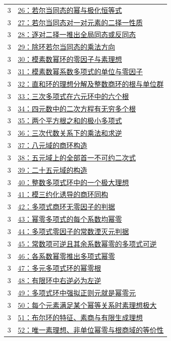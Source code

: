 \documentclass[UTF8,a4paper,11pt,fontset=windows]{ctexart}
\begin{document}
\begin{longtable}{cp{13.5cm}}
3 & \hyperref[ex:3:26]{26：若尔当同态的幂与极化恒等式}\\
3 & \hyperref[ex:3:27]{27：若尔当同态对一对元素的二择一性质}\\
3 & \hyperref[ex:3:28]{28：逐对二择一推出全局同态或反同态}\\
3 & \hyperref[ex:3:29]{29：除环若尔当同态的乘法方向}\\
3 & \hyperref[ex:3:30]{30：模素数幂环的零因子与素理想}\\
3 & \hyperref[ex:3:31]{31：模素数幂系数多项式的单位与零因子}\\
3 & \hyperref[ex:3:32]{32：直和环的理想分解及整数商环的根与单位群}\\
3 & \hyperref[ex:3:33]{33：三次多项式在六元环中的六个根}\\
3 & \hyperref[ex:3:34]{34：四元数中的二次方程有无穷多个根}\\
3 & \hyperref[ex:3:35]{35：两个平方根之和的极小多项式}\\
3 & \hyperref[ex:3:36]{36：三次代数关系下的乘法和求逆}\\
3 & \hyperref[ex:3:37]{37：八元域的商环构造}\\
3 & \hyperref[ex:3:38]{38：五元域上的全部首一不可约二次式}\\
3 & \hyperref[ex:3:39]{39：二十五元域的构造}\\
3 & \hyperref[ex:3:40]{40：整数多项式环中的一个极大理想}\\
3 & \hyperref[ex:3:41]{41：模三约化诱导的商环同构}\\
3 & \hyperref[ex:3:42]{42：多项式商环无零因子的判据}\\
3 & \hyperref[ex:3:43]{43：幂零多项式的每个系数均幂零}\\
3 & \hyperref[ex:3:44]{44：多项式零因子的常数湮灭元判据}\\
3 & \hyperref[ex:3:45]{45：常数项可逆且其余系数幂零的多项式可逆}\\
3 & \hyperref[ex:3:46]{46：各系数幂零推出多项式幂零}\\
3 & \hyperref[ex:3:47]{47：多元多项式环的幂零根}\\
3 & \hyperref[ex:3:48]{48：有限环中右逆必为左逆}\\
3 & \hyperref[ex:3:49]{49：多项式环中强拟正则元就是幂零元}\\
3 & \hyperref[ex:3:50]{50：每个元素满足某个幂等关系时素理想极大}\\
3 & \hyperref[ex:3:51]{51：布尔环的特征、素商与有限生成理想}\\
3 & \hyperref[ex:3:52]{52：唯一素理想、非单位幂零与根商域的等价性}\\

\end{longtable}
\end{document}
